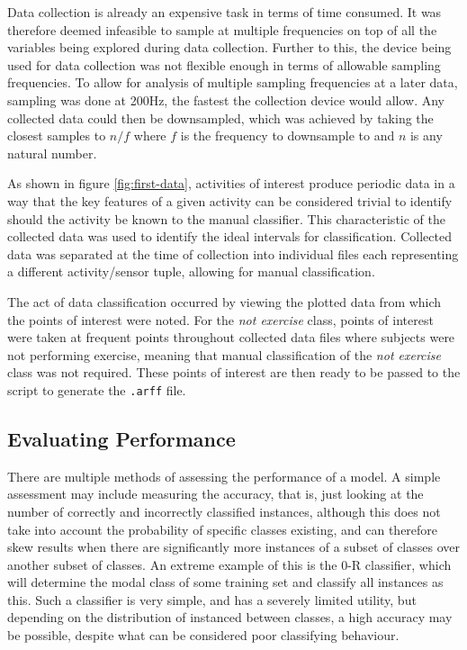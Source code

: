 Data collection is already an expensive task in terms of time consumed. It was therefore deemed infeasible to sample at multiple frequencies on top of all the variables being explored during data collection. Further to this, the device being used for data collection was not flexible enough in terms of allowable sampling frequencies. To allow for analysis of multiple sampling frequencies at a later data, sampling was done at 200Hz, the fastest the collection device would allow. Any collected data could then be downsampled, which was achieved by taking the closest samples to $n/f$ where $f$ is the frequency to downsample to and $n$ is any natural number.

As shown in figure \ref{fig:first-data}, activities of interest produce periodic data in a way that the key features of a given activity can be considered trivial to identify should the activity be known to the manual classifier. This characteristic of the collected data was used to identify the ideal intervals for classification. Collected data was separated at the time of collection into individual files each representing a different activity/sensor tuple, allowing for manual classification. 

The act of data classification occurred by viewing the plotted data from which the points of interest were noted. For the \textit{not exercise} class, points of interest were taken at frequent points throughout collected data files where subjects were not performing exercise, meaning that manual classification of the \textit{not exercise} class was not required. These points of interest are then ready to be passed to the script to generate the \texttt{.arff} file.

\subsection{Evaluating Performance}
There are multiple methods of assessing the performance of a model. A simple assessment may include measuring the accuracy, that is, just looking at the number of correctly and incorrectly classified instances, although this does not take into account the probability of specific classes existing, and can therefore skew results when there are significantly more instances of a subset of classes over another subset of classes. An extreme example of this is the 0-R classifier, which will determine the modal class of some training set and classify all instances as this. Such a classifier is very simple, and has a severely limited utility, but depending on the distribution of instanced between classes, a high accuracy may be possible, despite what can be considered poor classifying behaviour.


